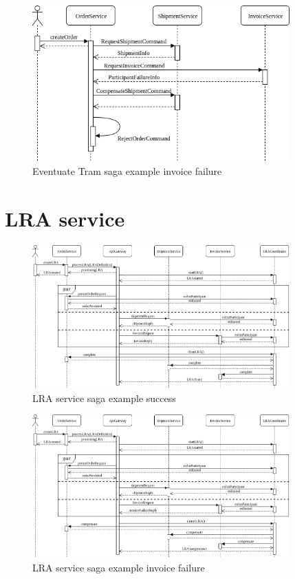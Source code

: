 \documentclass[oneside,
  digital, %
  table,   %
  nolof,     %
  nolot,     %
]{fithesis3}
\begin{document}
\hfill \break

\begin{figure}[h]
    \begin{center}
        \includegraphics[height=60mm]{images/sequence/invoiceFailSagaTram.png}
    \end{center}
    \caption{Eventuate Tram saga example invoice failure}
\end{figure}

\clearpage
\section{LRA service}

\begin{figure}[h]
    \begin{center}
        \includegraphics[height=55mm]{images/sequence/validSagaLRA.png}
    \end{center}
    \caption{LRA service saga example success}
\end{figure}

\hfill \break

\begin{figure}[h]
    \begin{center}
        \includegraphics[height=55mm]{images/sequence/invoiceFailSagaLRA.png}
    \end{center}
    \caption{LRA service saga example invoice failure}
\end{figure}
\end{document}
